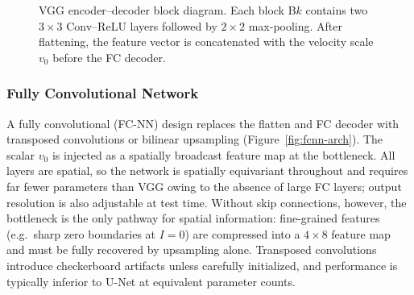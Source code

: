 \documentclass[conference,compsoc]{IEEEtran}
\begin{document}
\begin{figure}[htbp]
\centering
{}
\caption{VGG encoder--decoder block diagram. Each block B$k$ contains two $3{\times}3$ Conv--ReLU layers followed by $2{\times}2$ max-pooling. After flattening, the feature vector is concatenated with the velocity scale $v_0$ before the FC decoder.}
\label{fig:vgg-arch}
\end{figure}

\subsubsection{Fully Convolutional Network}

A fully convolutional (FC-NN) design replaces the flatten and FC decoder with transposed convolutions or bilinear upsampling (Figure~\ref{fig:fcnn-arch}). The scalar $v_0$ is injected as a spatially broadcast feature map at the bottleneck. All layers are spatial, so the network is spatially equivariant throughout and requires far fewer parameters than VGG owing to the absence of large FC layers; output resolution is also adjustable at test time. Without skip connections, however, the bottleneck is the only pathway for spatial information: fine-grained features (e.g.\ sharp zero boundaries at $I=0$) are compressed into a $4\times8$ feature map and must be fully recovered by upsampling alone. Transposed convolutions introduce checkerboard artifacts unless carefully initialized, and performance is typically inferior to U-Net at equivalent parameter counts.
\end{document}
